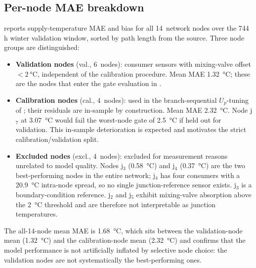 \documentclass[a4paper,fleqn]{cas-dc}
\begin{document}
\subsection{Per-node MAE breakdown}
\label{app:per_node_mae}

 reports supply-temperature MAE and bias
for all 14~network nodes over the 744\,h winter validation window,
sorted by path length from the source.  Three node groups are
distinguished:
%
\begin{itemize}[nosep]
  \item \textbf{Validation nodes} (val., 6~nodes): consumer sensors
        with mixing-valve offset ${<}\SI{2}{\celsius}$,
        independent of the calibration procedure.  Mean MAE
        \SI{1.32}{\celsius}; these are the nodes that enter the
        gate evaluation in .
  \item \textbf{Calibration nodes} (cal., 4~nodes): used in the
        branch-sequential $U_p$-tuning of
        \citet{Maldonado2024}; their residuals are in-sample by
        construction.  Mean MAE \SI{2.32}{\celsius}.  Node j$_7$ at
        \SI{3.07}{\celsius} would fail the worst-node gate of
        \SI{2.5}{\celsius} if held out for validation.  This
        in-sample deterioration is expected and motivates the
        strict calibration/validation split.
  \item \textbf{Excluded nodes} (excl., 4~nodes): excluded for
        measurement reasons unrelated to model quality.  Nodes
        j$_3$ (\SI{0.58}{\celsius}) and j$_4$
        (\SI{0.37}{\celsius}) are the two best-performing nodes
        in the entire network; j$_4$ has four consumers with a
        \SI{20.9}{\celsius} intra-node spread, so no single
        junction-reference sensor exists.  j$_3$ is a
        boundary-condition reference.  j$_2$ and j$_5$ exhibit
        mixing-valve absorption above the \SI{2}{\celsius}
        threshold and are therefore not interpretable as junction
        temperatures.
\end{itemize}
%
The all-14-node mean MAE is \SI{1.68}{\celsius}, which sits
between the validation-node mean (\SI{1.32}{\celsius}) and the
calibration-node mean (\SI{2.32}{\celsius}) and confirms that the
model performance is not artificially inflated by selective node
choice: the validation nodes are not systematically the
best-performing ones.
\end{document}
